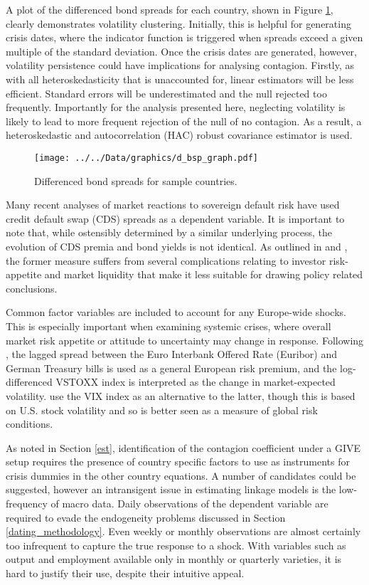 \documentclass[/../base.tex]{subfiles}
\begin{document}
A plot of the differenced bond spreads for each country, shown in Figure \ref{fig:dbsp}, clearly demonstrates volatility clustering. Initially, this is helpful for generating crisis dates, where the indicator function is triggered when spreads exceed a given multiple of the standard deviation. Once the crisis dates are generated, however, volatility persistence could have implications for analysing contagion. Firstly, as with all   heteroskedasticity that is unaccounted for, linear estimators will be less efficient. Standard errors will be underestimated and the null rejected too frequently. Importantly for the analysis presented here, neglecting volatility is likely to lead to more frequent rejection of the null of no contagion. As a result, a heteroskedastic and autocorrelation (HAC) robust covariance estimator is used. 

\begin{figure}
	\centering
	\texttt{[image: ../../Data/graphics/d\_bsp\_graph.pdf]}
	\caption{Differenced bond spreads for sample countries.}
	\label{fig:dbsp}
\end{figure}

Many recent analyses of market reactions to sovereign default risk have used credit default swap (CDS) spreads as a dependent variable. It is important to note that, while ostensibly determined by a similar underlying process, the evolution of CDS premia and bond yields is not identical. As outlined in  \cite{fontana2010analysis} and \cite{beirne2013pricing}, the former measure suffers from several complications relating to investor risk-appetite and market liquidity that make it less suitable for drawing policy related conclusions.

Common factor variables are included to account for any Europe-wide shocks. This is especially important when examining systemic crises, where overall market risk appetite or attitude to uncertainty may change in response. Following \cite{metiu2012sovereign}, the lagged spread between the Euro Interbank Offered Rate (Euribor) and German Treasury bills is used as a general European risk premium, and the log-differenced VSTOXX index is interpreted as the change in market-expected volatility. \cite{giordano2013pure} use the VIX index as an alternative to the latter, though this is based on U.S. stock volatility and so is better seen as a measure of global risk conditions.  

As noted in Section \ref{est}, identification of the contagion coefficient under a GIVE setup requires the presence of country specific factors to use as instruments for crisis dummies in the other country equations. A number of candidates could be suggested, however an intransigent issue in estimating linkage models is the low-frequency of macro data. Daily observations of the dependent variable are required to evade the endogeneity problems discussed in Section \ref{dating_methodology}. Even weekly or monthly observations are almost certainly too infrequent to capture the true response to a shock. With variables such as output and employment available only in monthly or quarterly varieties, it is hard to justify their use, despite their intuitive appeal. 
\end{document}
